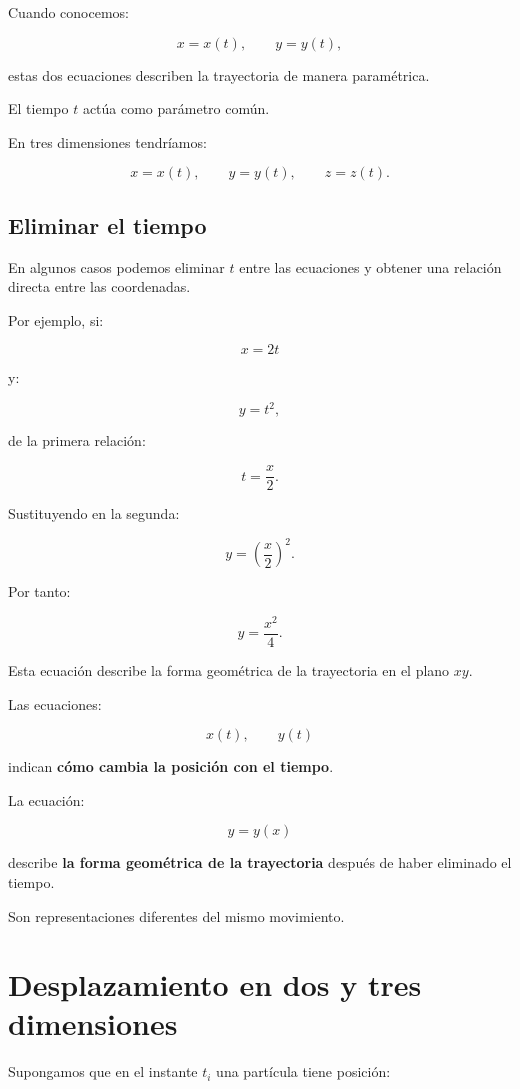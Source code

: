 Cuando conocemos:

\[
x=x(t),
\qquad
y=y(t),
\]

estas dos ecuaciones describen la trayectoria de manera paramétrica.

El tiempo \(t\) actúa como parámetro común.

En tres dimensiones tendríamos:

\[
x=x(t),
\qquad
y=y(t),
\qquad
z=z(t).
\]

\subsection{Eliminar el tiempo}

En algunos casos podemos eliminar \(t\) entre las ecuaciones y obtener una
relación directa entre las coordenadas.

Por ejemplo, si:

\[
x=2t
\]

y:

\[
y=t^2,
\]

de la primera relación:

\[
t=\frac{x}{2}.
\]

Sustituyendo en la segunda:

\[
y=\left(\frac{x}{2}\right)^2.
\]

Por tanto:

\[
\boxed{
y=\frac{x^2}{4}
}.
\]

Esta ecuación describe la forma geométrica de la trayectoria en el plano \(xy\).

\begin{interpretacion}
Las ecuaciones:

\[
x(t),\qquad y(t)
\]

indican \textbf{cómo cambia la posición con el tiempo}.

La ecuación:

\[
y=y(x)
\]

describe \textbf{la forma geométrica de la trayectoria} después de haber
eliminado el tiempo.

Son representaciones diferentes del mismo movimiento.
\end{interpretacion}


\section{Desplazamiento en dos y tres dimensiones}

Supongamos que en el instante \(t_i\) una partícula tiene posición:

